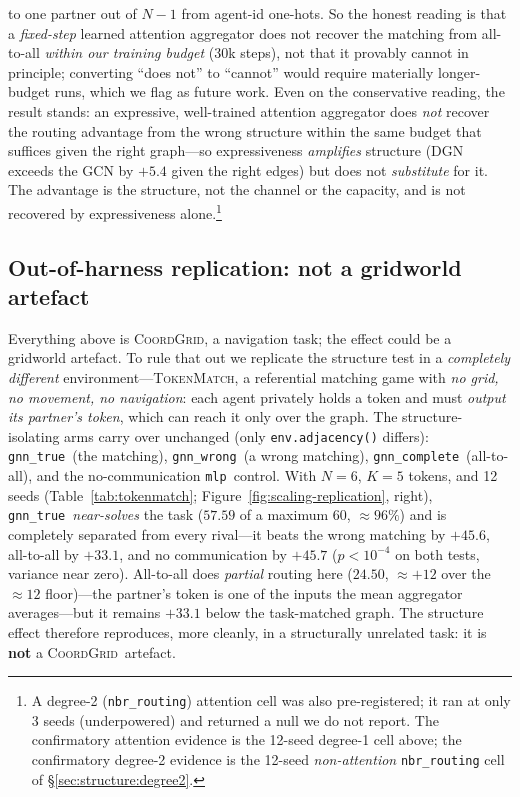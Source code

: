 \documentclass[manuscript, screen, review]{jair}
\newcommand{\coordgrid}{\textsc{CoordGrid}}
\newcommand{\gtrue}{\texttt{gnn\_true}}
\newcommand{\gwrong}{\texttt{gnn\_wrong}}
\newcommand{\gcomplete}{\texttt{gnn\_complete}}
\newcommand{\mlpc}{\texttt{mlp}}
\newcommand{\tokenmatch}{\textsc{TokenMatch}}
\newcommand{\TMmax}{60}               %
\newcommand{\TMfloor}{12}             %
\newcommand{\TMcomplete}{24.50}       %
\newcommand{\TMtrue}{57.59}           %
\newcommand{\TMfrac}{96}              %
\newcommand{\TMtwGap}{+45.6}          %
\newcommand{\TMtcGap}{+33.1}          %
\newcommand{\TMtmGap}{+45.7}          %
\begin{document}
to one partner out of $N{-}1$ from agent-id one-hots. So the honest reading is
that a \emph{fixed-step} learned attention aggregator does not recover the
matching from all-to-all \emph{within our training budget} (30k steps), not that
it provably cannot in principle; converting ``does not'' to ``cannot'' would
require materially longer-budget runs, which we flag as future work. Even on the
conservative reading, the result stands: an expressive, well-trained attention
aggregator does \emph{not} recover the routing advantage from the wrong
structure within the same budget that suffices given the right graph---so
expressiveness \emph{amplifies} structure (DGN exceeds the GCN by $+5.4$ given
the right edges) but does not \emph{substitute} for it. The advantage is the
structure, not the channel or the capacity, and is not recovered by
expressiveness alone.\footnote{A degree-2 (\texttt{nbr\_routing}) attention cell
was also pre-registered; it ran at only 3 seeds (underpowered) and returned a
null we do not report. The confirmatory attention evidence is the 12-seed
degree-1 cell above; the confirmatory degree-2 evidence is the 12-seed
\emph{non-attention} \texttt{nbr\_routing} cell of
\S\ref{sec:structure:degree2}.}

\subsection{Out-of-harness replication: not a gridworld artefact}
\label{sec:structure:tokenmatch}

Everything above is \coordgrid, a navigation task; the effect could be a
gridworld artefact. To rule that out we replicate the structure test in a
\emph{completely different} environment---\tokenmatch, a referential matching
game with \emph{no grid, no movement, no navigation}: each agent privately
holds a token and must \emph{output its partner's token}, which can reach it
only over the graph. The structure-isolating arms carry over unchanged (only
\texttt{env.adjacency()} differs): \gtrue\ (the matching), \gwrong\ (a wrong
matching), \gcomplete\ (all-to-all), and the no-communication \mlpc\ control.
With $N{=}6$, $K{=}5$ tokens, and 12 seeds (Table~\ref{tab:tokenmatch};
Figure~\ref{fig:scaling-replication}, right),
\gtrue\ \emph{near-solves} the task ($\TMtrue$ of a maximum $\TMmax$, ${\approx}\TMfrac\%$)
and is completely separated from every rival---it beats the wrong matching by
$\TMtwGap$, all-to-all by $\TMtcGap$, and no communication by $\TMtmGap$
($p<10^{-4}$ on both tests, variance near zero). All-to-all does
\emph{partial} routing here ($\TMcomplete$, ${\approx}{+}12$ over the
${\approx}\TMfloor$ floor)---the partner's token is one of the inputs the mean
aggregator averages---but it remains $\TMtcGap$ below the task-matched graph.
The structure effect therefore reproduces, more cleanly, in a structurally
unrelated task: it is \textbf{not} a \coordgrid\ artefact.
\end{document}
